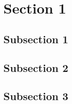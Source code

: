 \section{Section 1}
\lipsum[1-10]

\subsection{Subsection 1}
\lipsum[1-10]

\subsection{Subsection 2}
\lipsum[1-10]

\subsection{Subsection 3}
\lipsum[1-10]
